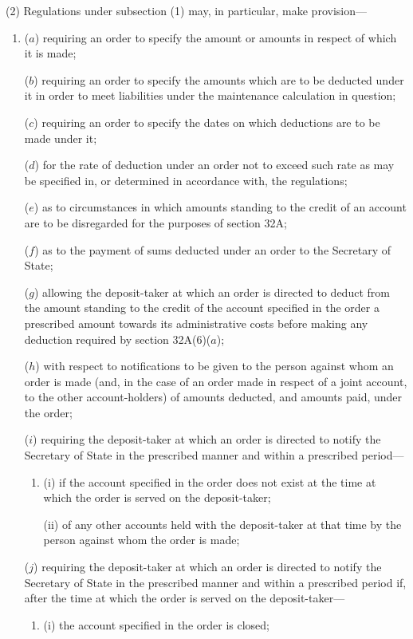 \documentclass[12pt,a4paper]{article}
\begin{document}
(2) Regulations under subsection (1) may, in particular, make provision---
\begin{enumerate}\item[]
($a$) requiring an order to specify the amount or amounts in respect of which it is made;

($b$) requiring an order to specify the amounts which are to be deducted under it
in order to meet liabilities under the maintenance calculation in question;

($c$) requiring an order to specify the dates on which deductions are to be made
under it;

($d$) for the rate of deduction under an order not to exceed such rate as may be
specified in, or determined in accordance with, the regulations;

($e$) as to circumstances in which amounts standing to the credit of an account
are to be disregarded for the purposes of section 32A;

($f$) as to the payment of sums deducted under an order to the Secretary of
State;

($g$) allowing the deposit-taker at which an order is directed to deduct from the
amount standing to the credit of the account specified in the order a prescribed
amount towards its administrative costs before making any deduction required
by section 32A(6)($a$);

($h$) with respect to notifications to be given to the person against whom an order
is made (and, in the case of an order made in respect of a joint account, to the
other account-holders) of amounts deducted, and amounts paid, under the
order;

($i$) requiring the deposit-taker at which an order is directed to notify the
Secretary of State in the prescribed manner and within a prescribed period---
\begin{enumerate}\item[]
(i)
if the account specified in the order does not exist at the time at which
the order is served on the deposit-taker;

(ii)
of any other accounts held with the deposit-taker at that time by the
person against whom the order is made;
\end{enumerate}

($j$) requiring the deposit-taker at which an order is directed to notify the
Secretary of State in the prescribed manner and within a prescribed period
if, after the time at which the order is served on the deposit-taker---
\begin{enumerate}\item[]
(i) the account specified in the order is closed;


\end{enumerate}
\end{enumerate}
\end{document}

